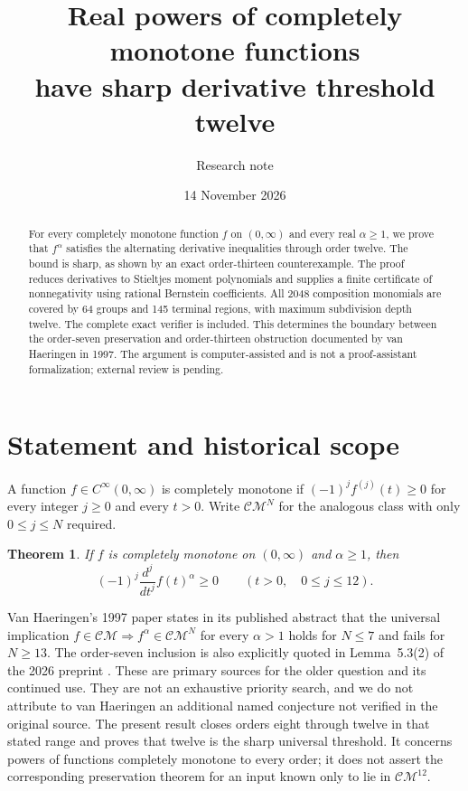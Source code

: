 \documentclass[11pt]{article}
\title{Real powers of completely monotone functions\protect\\have sharp derivative threshold twelve}
\author{Research note}
\date{14 November 2026}
\newtheorem{theorem}{Theorem}
\newcommand{\CM}{\mathcal{CM}}
\begin{document}
\maketitle
\begin{abstract}
For every completely monotone function $f$ on $(0,\infty)$ and every real
$\alpha\ge1$, we prove that $f^\alpha$ satisfies the alternating derivative
inequalities through order twelve. The bound is sharp, as shown by an exact
order-thirteen counterexample. The proof reduces derivatives to Stieltjes
moment polynomials and supplies a finite certificate of nonnegativity using
rational Bernstein coefficients. All 2048 composition monomials are covered
by 64 groups and 145 terminal regions, with maximum subdivision depth twelve.
The complete exact verifier is included. This determines the boundary between
the order-seven preservation and order-thirteen obstruction documented by
van Haeringen in 1997. The argument is computer-assisted and is not a
proof-assistant formalization; external review is pending.
\end{abstract}

\section{Statement and historical scope}

A function $f\in C^\infty(0,\infty)$ is completely monotone if
$(-1)^jf^{(j)}(t)\ge0$ for every integer $j\ge0$ and every $t>0$.
Write $\CM^N$ for the analogous class with only $0\le j\le N$ required.

\begin{theorem}\label{thm:main}
If $f$ is completely monotone on $(0,\infty)$ and $\alpha\ge1$, then
\[
(-1)^j\frac{d^j}{dt^j}f(t)^\alpha\ge0
\qquad(t>0,\quad 0\le j\le12).
\]
\end{theorem}

Van Haeringen's 1997 paper \cite{vH} states in its published abstract that the
universal implication $f\in\CM\Rightarrow f^\alpha\in\CM^N$ for every
$\alpha>1$ holds for $N\le7$ and fails for $N\ge13$.
The order-seven inclusion is also explicitly quoted in Lemma~5.3(2) of the
2026 preprint \cite{SW}. These are primary sources for the older question and
its continued use. They are not an exhaustive priority search, and we do not
attribute to van Haeringen an additional named conjecture not verified in the
original source. The present result closes orders eight through twelve in
that stated range and proves that twelve is the sharp universal threshold.
It concerns powers of functions completely monotone to every order; it does
not assert the corresponding preservation theorem for an input known only
to lie in $\CM^{12}$.
\end{document}

